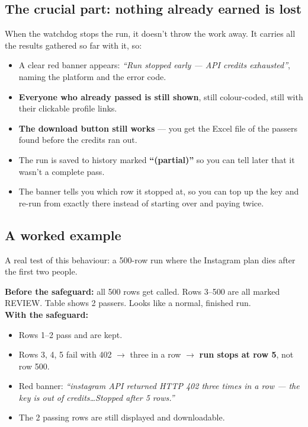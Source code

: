 \documentclass[11pt]{article}
\begin{document}
\subsection{The crucial part: nothing already earned is lost}

When the watchdog stops the run, it doesn't throw the work away. It carries all
the results gathered so far with it, so:

\begin{itemize}
  \item A clear red banner appears: \emph{``Run stopped early — API credits
  exhausted''}, naming the platform and the error code.
  \item \textbf{Everyone who already passed is still shown}, still colour-coded,
  still with their clickable profile links.
  \item \textbf{The download button still works} — you get the Excel file of the
  passers found before the credits ran out.
  \item The run is saved to history marked \textbf{``(partial)''} so you can
  tell later that it wasn't a complete pass.
  \item The banner tells you which row it stopped at, so you can top up the key
  and re-run from exactly there instead of starting over and paying twice.
\end{itemize}

\subsection{A worked example}

A real test of this behaviour: a 500-row run where the Instagram plan dies after
the first two people.

\begin{plainbox}
\small
\textbf{Before the safeguard:} all 500 rows get called. Rows 3--500 are all
marked REVIEW. Table shows 2 passers. Looks like a normal, finished run. \\[6pt]
\textbf{With the safeguard:}
\begin{itemize}[topsep=2pt]
  \item Rows 1--2 pass and are kept.
  \item Rows 3, 4, 5 fail with 402 $\rightarrow$ three in a row $\rightarrow$
  \textbf{run stops at row 5}, not row 500.
  \item Red banner: \emph{``instagram API returned HTTP 402 three times in a
  row --- the key is out of credits\ldots Stopped after 5 rows.''}
  \item The 2 passing rows are still displayed and downloadable.
\end{itemize}
\end{plainbox}
\end{document}

